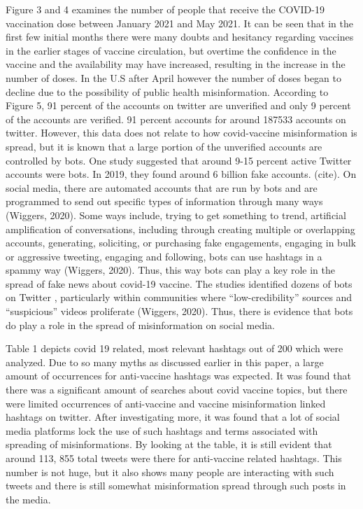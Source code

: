 \documentclass[10pt,twocolumn,letterpaper]{article}
\begin{document}
Figure 3 and 4 examines the number of people that receive the COVID-19 vaccination dose between January 2021 and May 2021. It can be seen that in the first few initial months there were many doubts and hesitancy regarding vaccines in the earlier stages of vaccine circulation, but overtime the confidence in the vaccine and the availability may have increased, resulting in the increase in the number of doses. In the U.S after April however the number of doses began to decline due to the possibility of public health misinformation.
According to Figure 5, 91 percent of the accounts on twitter are unverified and only 9 percent of the accounts are verified. 91 percent accounts for around 187533 accounts on twitter. However, this data does not relate to how covid-vaccine misinformation is spread, but it is known that a large portion of the unverified accounts are controlled by bots. One study suggested that around 9-15 percent active Twitter accounts were bots. In 2019, they found around 6 billion fake accounts.  (cite).  On social media, there are automated accounts that are run by bots and are programmed to send out specific types of information through many ways (Wiggers, 2020). Some ways include, trying to get something to trend, artificial amplification of conversations, including through creating multiple or overlapping accounts, generating, soliciting, or purchasing fake engagements, engaging in bulk or aggressive tweeting, engaging and following, bots can use hashtags in a spammy way (Wiggers, 2020). Thus, this way  bots can play a key role in the spread of fake news about covid-19 vaccine. The studies identified dozens of bots on Twitter , particularly within communities where “low-credibility” sources and “suspicious” videos proliferate (Wiggers, 2020). Thus, there is evidence that bots do play a role in the spread of misinformation on social media. 

Table 1 depicts  covid 19 related, most relevant hashtags out of 200 which were analyzed. Due to so many myths as discussed earlier in this paper, a large amount of occurrences for anti-vaccine hashtags was expected. It was found that there was a significant amount of searches about covid vaccine topics, but there were limited occurrences of anti-vaccine and vaccine misinformation linked hashtags on twitter. After investigating more, it was found that a lot of social media platforms lock the use of such hashtags and terms associated with spreading of misinformations. By looking at the table, it is still evident that around 113, 855 total tweets were there for anti-vaccine related hashtags. This number is not huge, but it also shows many people are interacting with such tweets and there is still somewhat misinformation spread through such posts in the media. 
\end{document}
